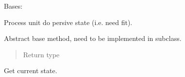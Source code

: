 \documentclass[letterpaper,10pt,english]{sphinxmanual}
\begin{document}
\begin{fulllineitems}
\label{\detokenize{matchzoo:matchzoo.preprocessors.StatefulProcessorUnit}}
Bases: {\hyperref[\detokenize{matchzoo:matchzoo.preprocessors.ProcessorUnit}]{}}

Process unit do persive state (i.e. need fit).

\begin{fulllineitems}
\label{\detokenize{matchzoo:matchzoo.preprocessors.StatefulProcessorUnit.fit}}
Abstract base method, need to be implemented in subclass.
\begin{quote}\begin{description}
\item[{Return type}] \leavevmode
{}

\end{description}\end{quote}

\end{fulllineitems}


\begin{fulllineitems}
\label{\detokenize{matchzoo:matchzoo.preprocessors.StatefulProcessorUnit.state}}
Get current state.

\end{fulllineitems}


\end{fulllineitems}

\end{document}
